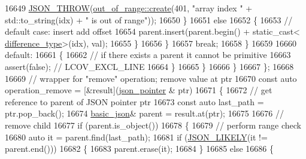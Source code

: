 \begin{DoxyCode}
16649                                 \hyperlink{json_8hpp_a6c274f6db2e65c1b66c7d41b06ad690f}{JSON\_THROW}(\hyperlink{classnlohmann_1_1detail_1_1out__of__range_a3f6d82a6f967c4728a1ec735a7867073}{out\_of\_range::create}(401, \textcolor{stringliteral}{"array
       index "} + std::to\_string(idx) + \textcolor{stringliteral}{" is out of range"}));
16650                             \}
16651                             \textcolor{keywordflow}{else}
16652                             \{
16653                                 \textcolor{comment}{// default case: insert add offset}
16654                                 parent.insert(parent.begin() + \textcolor{keyword}{static\_cast<}
      \hyperlink{classnlohmann_1_1basic__json_afe7c1303357e19cea9527af4e9a31d8f}{difference\_type}\textcolor{keyword}{>}(idx), val);
16655                             \}
16656                         \}
16657                         \textcolor{keywordflow}{break};
16658                     \}
16659 
16660                     \textcolor{keywordflow}{default}:
16661                     \{
16662                         \textcolor{comment}{// if there exists a parent it cannot be primitive}
16663                         assert(\textcolor{keyword}{false});  \textcolor{comment}{// LCOV\_EXCL\_LINE}
16664                     \}
16665                 \}
16666             \}
16667         \};
16668 
16669         \textcolor{comment}{// wrapper for "remove" operation; remove value at ptr}
16670         \textcolor{keyword}{const} \textcolor{keyword}{auto} operation\_remove = [&result](\hyperlink{classnlohmann_1_1basic__json_a6886a5001f5b449ad316101a311ce536}{json\_pointer} & ptr)
16671         \{
16672             \textcolor{comment}{// get reference to parent of JSON pointer ptr}
16673             \textcolor{keyword}{const} \textcolor{keyword}{auto} last\_path = ptr.pop\_back();
16674             \hyperlink{classnlohmann_1_1basic__json_aed115142bd0c6c66c864700e0467df55}{basic\_json}& parent = result.at(ptr);
16675 
16676             \textcolor{comment}{// remove child}
16677             \textcolor{keywordflow}{if} (parent.is\_object())
16678             \{
16679                 \textcolor{comment}{// perform range check}
16680                 \textcolor{keyword}{auto} it = parent.find(last\_path);
16681                 \textcolor{keywordflow}{if} (\hyperlink{json_8hpp_a41ecd1c4cf7c3d56477b9b685b5daa72}{JSON\_LIKELY}(it != parent.end()))
16682                 \{
16683                     parent.erase(it);
16684                 \}
16685                 \textcolor{keywordflow}{else}
16686                 \{

\end{DoxyCode}
